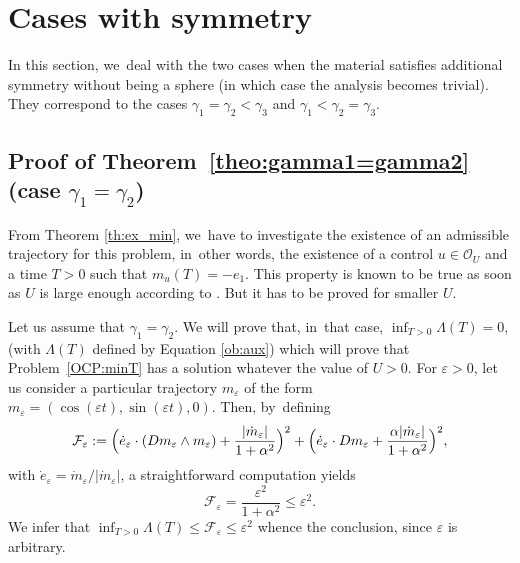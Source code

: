 \documentclass[JEP,XML,SOM,Unicode,NoEqCountersInSection,NoFloatCountersInSection,published]{cedram}
\theoremstyle{definition}
\begin{document}
\section{Cases with symmetry}\label{sec:ProofSym}

In this section, we~deal with the two cases when the material satisfies additional symmetry without being a sphere (in which case the analysis becomes trivial). They correspond to the cases $\gamma_1 = \gamma_2 < \gamma_3$ and $\gamma_1 < \gamma_2 = \gamma_3$.

\subsection{Proof of Theorem~\ref{theo:gamma1=gamma2} (case \texorpdfstring{$\gamma_1=\gamma_2$}{gamma1=gamma2})}

From Theorem \ref{th:ex_min}, we~have to investigate the existence of an admissible trajectory for this problem, in~other words, the existence of a control $u\in \mathcal{O}_U$ and a time $T>0$ such that $m_u(T)=-e_1$. This property is known to be true as soon as $U $ is large enough according to \cite{alouges2009magnetization}. But it has to be proved for smaller $U $.

Let us assume that $\gamma_1=\gamma_2$.
We will prove that, in~that case, $\inf_{T>0}\Lambda(T)=0$, (with $\Lambda(T)$ defined by Equation \eqref{ob:aux}) which will prove that Problem~\eqref{OCP:minT} has a solution whatever the value of $U >0$. For $\varepsilon>0$, let us consider a particular trajectory $m_\varepsilon$ of the form $m_\varepsilon=(\cos (\varepsilon t),\sin(\varepsilon t),0)$. Then, by~defining
\[
\mathcal F_\varepsilon: = \Bigl(\dot e_\varepsilon\cdot (Dm_\varepsilon\wedge m_\varepsilon)+\frac{|\dot m_\varepsilon|}{1+\alpha^2}\Bigr)^2+\Bigl(\dot e_\varepsilon\cdot Dm_\varepsilon+\frac{\alpha|\dot m_\varepsilon|}{1+\alpha^2}\Bigr)^2,
\]
with $\dot e_\varepsilon=\dot m_\varepsilon/|\dot m_\varepsilon|$, a straightforward computation yields
\[
\mathcal F_\varepsilon=\frac{\varepsilon^2}{1+\alpha^2}\leq \varepsilon^2.
\]
We infer that $\inf_{T>0}\Lambda(T)\leq \mathcal F_\varepsilon\leq \varepsilon^2$ whence the conclusion, since $\varepsilon$ is arbitrary.
\end{document}
